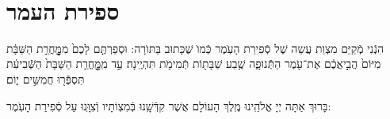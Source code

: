 \documentclass[twoside, openany, parskip=half, 11pt]{book}
\begin{document}
\vfill

\quad{}\quad{}\\

\chapter[ספירת העמר]{ ספירת העמר }
\label{sefiras haomer}

הִנְֿנִי מְֿקַיֵּם מִצְוַת עֲשֵה שֶׁל סְֿפִירַת הָעֽׂמֶר כְּֿמוׂ שֶׁכָּתוּב בַּתּוׂרָה: וּסְפַרְתֶּ֤ם לָכֶם֙ מִמׇׇׇׇׇׇׇׇׇׇׇׇָּחֳרַ֣ת הַשַּׁבָּ֔ת מִיּוֹם֙ הֲבִ֣יאֲכֶ֔ם אֶת־עֹ֖מֶר הַתְּֿֿנוּפָ֑ה שֶׁ֥בַע שַׁבָּת֖וֹת תְּֿמִימֹ֥ת תִּהְיֶֽינָה׃ עַ֣ד מִֽמׇׇׇׇׇׇׇׇׇׇׇׇָּחֳרַ֤ת הַשַּׁבָּת֙ הַשְּֿֿׁבִיעִ֔ת תִּסְפְּֿֿֿר֖וּ חֲמִשִּׁ֣ים י֑וֹם׃

בָּרוּךְ אַתָּה יְיָ אֱלֹהֵֽינוּ מֶֽלֶךְ הָעוֹלָם אֲשֶׁר קִדְּֿשָֽׁנוּ בְּֿמִצְוֹתָיו וְֿצִוָּֽנוּ עַל סְֿפִירַת הָעֹֽמֶר:\\
\end{document}
